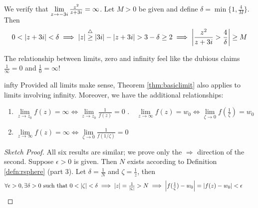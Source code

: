 \begin{example}{}{}
	We verify that $\smash{\lim\limits_{z\to -3i}}\,\frac{z^2}{z+3i}=\infty$. Let $M>0$ be given and define $\delta=\min\{1,\frac 4{M}\}$. Then
  \[
  	0<\nm{z+3i}<\delta \implies \nm z\overset{\triangle}{\ge} \nm{3i}-\nm{z+3i}>3-\delta\ge 2 \implies \nm{\frac{z^2}{z+3i} > \frac{4}{\delta}} \ge M
  \]
\end{example}


The relationship between limits, zero and infinity feel like the dubious claims $\frac 1\infty=0$ and $\frac 10=\infty$!

\begin{thm}{}{infty}
	Provided all limits make sense, Theorem \ref{thm:basiclimit} also applies to limits involving infinity. Moreover, we have the additional relationships:
	\begin{enumerate}
	  \item $\lim\limits_{z\to z_0}f(z)=\infty \iff \lim\limits_{z\to z_0}\frac 1{f(z)}=0$ \qquad{}.\ \ $\lim\limits_{z\to\infty}f(z)=w_0 \iff \lim\limits_{\zeta\to 0}f\left(\frac 1{\zeta}\right)=w_0$
	  \setcounter{enumi}{2}
	  \item $\lim\limits_{z\to \infty}f(z)=\infty \iff \lim\limits_{\zeta\to 0}\frac 1{f(1/\zeta)}=0$
	\end{enumerate}
\end{thm}

\begin{proof}[Sketch Proof]
	All six results are similar; we prove only the $\Rightarrow$ direction of the second. Suppose $\epsilon>0$ is given. Then $N$ exists according to Definition \ref{defn:rsphere} (part 3). Let $\delta=\frac 1N$ and $\zeta=\frac 1z$, then
	\[
		\forall \epsilon>0,\exists \delta>0\text{ such that }0< \left| \zeta\right|<\delta \implies \left| z\right| =\tfrac 1{\left| \zeta\right|}>N\implies \left| f(\tfrac 1\zeta)-w_0\right|=\left| f(z)-w_0\right|<\epsilon \tag*{\qedhere}
	\]
\end{proof}


